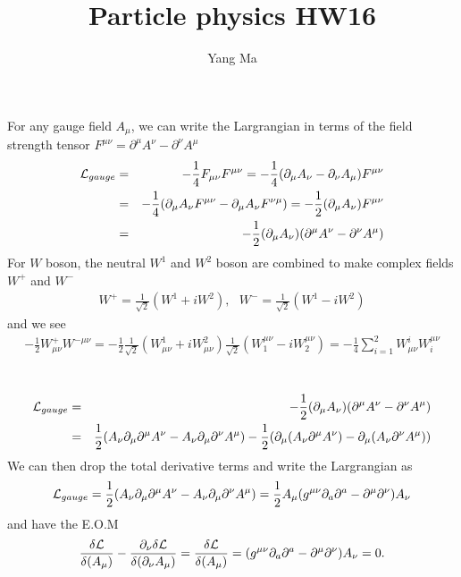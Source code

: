 \documentclass[11pt]{article}
\def\del{{\partial}}
\begin{document}
\title{Particle physics HW16}
\author{Yang Ma}

\maketitle

\section{ }
For any gauge field $A_\mu$, we can write the Largrangian in terms of the field strength tensor $F^{\mu \nu} = \del^\mu A^\nu -\del^\nu A^\mu$ 
\begin{eqnarray}
    {\cal L}_{gauge}
  &=& -\frac{1}{4} F_{\mu\nu} F^{\mu\nu} = -\frac{1}{4}(\del_\mu A_\nu-\del_\nu A_\mu)F^{\mu\nu}\\ 
  &=&-\frac{1}{4}(\del_\mu A_\nu F^{\mu\nu}-\del_\mu A_\nu F^{\nu\mu}) 
  = -\frac{1}{2} (\del_\mu A_\nu)F^{\mu\nu} \\
  &=& -\frac{1}{2} (\del_\mu A_\nu) (\del^\mu A^\nu -\del^\nu A^\mu)
\end{eqnarray}
For $W$ boson, the neutral $W^1$ and $W^2$ boson are combined to make complex fields $W^+$ and $W^-$
\begin{eqnarray}
    W^+=\frac{1}{\sqrt 2} (W^1+i W^2), ~~~W^-=\frac{1}{\sqrt 2} (W^1-i W^2)
\end{eqnarray}
and we see
\begin{eqnarray}
    -\frac{1}{2} W^+_{\mu\nu} W^{- \mu\nu}=-\frac{1}{2} \frac{1}{\sqrt 2}(W^1_{\mu\nu}+i W^2_{\mu\nu})\frac{1}{\sqrt 2}(W_1^{\mu\nu}-i W_2^{\mu\nu})=-\frac{1}{4} \sum_{i=1}^2 W^i_{\mu\nu} W_i^{ \mu\nu}
\end{eqnarray}

\section{ }
\begin{eqnarray}
    {\cal L}_{gauge} &=& -\frac{1}{2} (\del_\mu A_\nu) (\del^\mu A^\nu -\del^\nu A^\mu) \\
    &=& \frac{1}{2} (A_\nu\del_\mu\del^\mu A^\nu -A_\nu \del_\mu\del^\nu A^\mu) - \frac{1}{2}( \del_\mu(A_\nu\del^\mu A^\nu) -\del_\mu(A_\nu\del^\nu A^\mu))
\end{eqnarray}
We can then drop the total derivative terms and write the Largrangian as 
\begin{eqnarray}
    {\cal L}_{gauge}=\frac{1}{2} (A_\nu\del_\mu\del^\mu A^\nu -A_\nu \del_\mu\del^\nu A^\mu) = \frac{1}{2} A_\mu (g^{\mu\nu} \del_a \del^a -\del^\mu \del^\nu) A_\nu
\end{eqnarray}
and have the E.O.M
\begin{eqnarray}
    \frac{\delta {\cal L}}{\delta(A_\mu)} -\frac{\del_\nu \delta {\cal L}}{\delta(\del_\nu A_\mu)}
  =  \frac{\delta {\cal L}}{\delta(A_\mu)}
  = (g^{\mu\nu} \del_a \del^a -\del^\mu \del^\nu) A_\nu
  = 0. 
\end{eqnarray}
\end{document}
